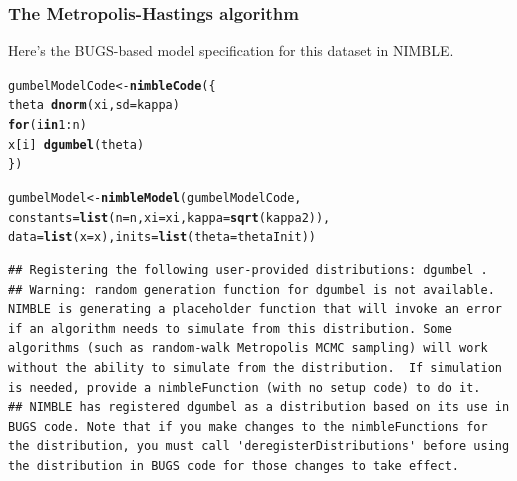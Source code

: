 \documentclass{beamer}\usepackage[]{graphicx}\usepackage[]{color}
\makeatletter
\newcommand{\hlnum}[1]{\textcolor[rgb]{0.686,0.059,0.569}{#1}}%
\newcommand{\hlopt}[1]{\textcolor[rgb]{0,0,0}{#1}}%
\newcommand{\hlstd}[1]{\textcolor[rgb]{0.345,0.345,0.345}{#1}}%
\newcommand{\hlkwa}[1]{\textcolor[rgb]{0.161,0.373,0.58}{\textbf{#1}}}%
\newcommand{\hlkwb}[1]{\textcolor[rgb]{0.69,0.353,0.396}{#1}}%
\newcommand{\hlkwc}[1]{\textcolor[rgb]{0.333,0.667,0.333}{#1}}%
\newcommand{\hlkwd}[1]{\textcolor[rgb]{0.737,0.353,0.396}{\textbf{#1}}}%
\newenvironment{kframe}{%
 \def\at@end@of@kframe{}%
 \ifinner\ifhmode%
  \def\at@end@of@kframe{\end{minipage}}%
  \begin{minipage}{\columnwidth}%
 \fi\fi%
 \def\FrameCommand##1{\hskip\@totalleftmargin \hskip-\fboxsep
 \colorbox{shadecolor}{##1}\hskip-\fboxsep
     \hskip-\linewidth \hskip-\@totalleftmargin \hskip\columnwidth}%
 \MakeFramed {\advance\hsize-\width
   \@totalleftmargin\z@ \linewidth\hsize
   \@setminipage}}%
 {\par\unskip\endMakeFramed%
 \at@end@of@kframe}
\newenvironment{knitrout}{}{} %
\makeatother
\begin{document}
\begin{frame}[fragile] 
\sffamily
\frametitle{The Metropolis-Hastings algorithm}

Here's the BUGS-based model specification for this dataset in NIMBLE. 





\begin{knitrout}\tiny
{}\color{fgcolor}\begin{kframe}
\begin{alltt}
\hlstd{gumbelModelCode} \hlkwb{<-} \hlkwd{nimbleCode}\hlstd{(\{}
    \hlstd{theta} \hlopt{~} \hlkwd{dnorm}\hlstd{(xi,} \hlkwc{sd} \hlstd{= kappa)}
    \hlkwa{for}\hlstd{(i} \hlkwa{in} \hlnum{1}\hlopt{:}\hlstd{n)}
          \hlstd{x[i]} \hlopt{~} \hlkwd{dgumbel}\hlstd{(theta)}
\hlstd{\})}

\hlstd{gumbelModel} \hlkwb{<-} \hlkwd{nimbleModel}\hlstd{(gumbelModelCode,}
          \hlkwc{constants} \hlstd{=} \hlkwd{list}\hlstd{(}\hlkwc{n} \hlstd{= n,} \hlkwc{xi} \hlstd{= xi,} \hlkwc{kappa} \hlstd{=} \hlkwd{sqrt}\hlstd{(kappa2)),}
          \hlkwc{data} \hlstd{=} \hlkwd{list}\hlstd{(}\hlkwc{x} \hlstd{= x),} \hlkwc{inits} \hlstd{=} \hlkwd{list}\hlstd{(}\hlkwc{theta} \hlstd{= thetaInit))}
\end{alltt}


{\ttfamily\noindent\itshape\color{messagecolor}{\#\# defining model...}}\begin{verbatim}
## Registering the following user-provided distributions: dgumbel .
## Warning: random generation function for dgumbel is not available. NIMBLE is generating a placeholder function that will invoke an error if an algorithm needs to simulate from this distribution. Some algorithms (such as random-walk Metropolis MCMC sampling) will work without the ability to simulate from the distribution.  If simulation is needed, provide a nimbleFunction (with no setup code) to do it.
## NIMBLE has registered dgumbel as a distribution based on its use in BUGS code. Note that if you make changes to the nimbleFunctions for the distribution, you must call 'deregisterDistributions' before using the distribution in BUGS code for those changes to take effect.
\end{verbatim}


{\ttfamily\noindent\itshape\color{messagecolor}{\#\# building model...}}

{\ttfamily\noindent\itshape\color{messagecolor}{\#\# setting data and initial values...}}

{\ttfamily\noindent\itshape\color{messagecolor}{\#\# running calculate on model (any error reports that follow may simply reflect missing values in model variables) ... \\\#\# checking model sizes and dimensions...\\\#\# model building finished.}}\end{kframe}
\end{knitrout}
\end{frame}
\end{document}

